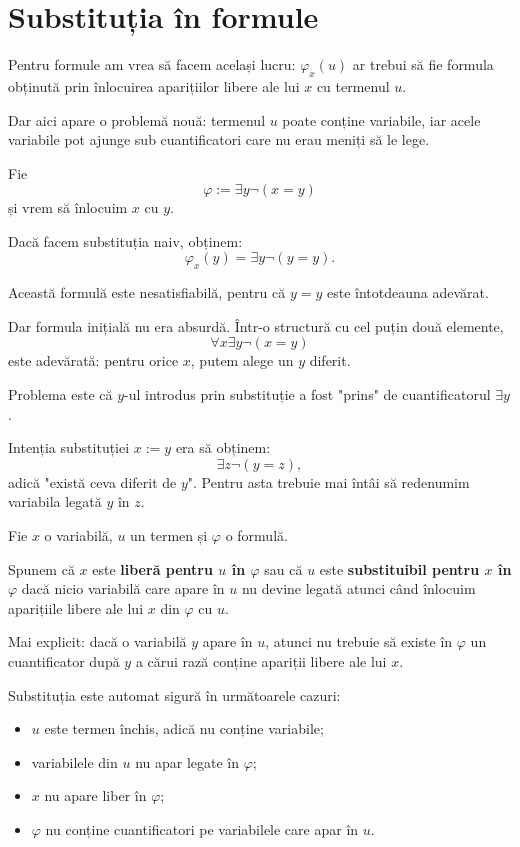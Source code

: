 \section{Substituția în formule}

Pentru formule am vrea să facem același lucru: \( \varphi_x(u) \) ar trebui să fie formula obținută prin înlocuirea aparițiilor libere ale lui \(x\) cu termenul \(u\).

Dar aici apare o problemă nouă: termenul \(u\) poate conține variabile, iar acele variabile pot ajunge sub cuantificatori care nu erau meniți să le lege.

\begin{eg}
	Fie
	\[
		\varphi := \exists y \neg(x=y)
	\]
	și vrem să înlocuim \(x\) cu \(y\).

	Dacă facem substituția naiv, obținem:
	\[
		\varphi_x(y)=\exists y \neg(y=y).
	\]

	Această formulă este nesatisfiabilă, pentru că \(y=y\) este întotdeauna adevărat.

	Dar formula inițială nu era absurdă. Într-o structură cu cel puțin două elemente,
	\[
		\forall x \exists y \neg(x=y)
	\]
	este adevărată: pentru orice \(x\), putem alege un \(y\) diferit.

	Problema este că \(y\)-ul introdus prin substituție a fost "prins" de cuantificatorul \( \exists y \).
\end{eg}

\begin{note}
	Intenția substituției \(x := y\) era să obținem:
	\[
		\exists z \neg(y=z),
	\]
	adică "există ceva diferit de \(y\)". Pentru asta trebuie mai întâi să redenumim variabila legată \(y\) în \(z\).
\end{note}

\begin{definition}
	Fie \(x\) o variabilă, \(u\) un termen și \( \varphi \) o formulă.

	Spunem că \(x\) este \textbf{liberă pentru \(u\) în \( \varphi \)} sau că \(u\) este \textbf{substituibil pentru \(x\) în \( \varphi \)} dacă nicio variabilă care apare în \(u\) nu devine legată atunci când înlocuim aparițiile libere ale lui \(x\) din \( \varphi \) cu \(u\).
\end{definition}

Mai explicit: dacă o variabilă \(y\) apare în \(u\), atunci nu trebuie să existe în \( \varphi \) un cuantificator după \(y\) a cărui rază conține apariții libere ale lui \(x\).

\begin{note}
	Substituția este automat sigură în următoarele cazuri:
	\begin{itemize}
		\item \(u\) este termen închis, adică nu conține variabile;
		\item variabilele din \(u\) nu apar legate în \( \varphi \);
		\item \(x\) nu apare liber în \( \varphi \);
		\item \( \varphi \) nu conține cuantificatori pe variabilele care apar în \(u\).
	\end{itemize}
\end{note}

